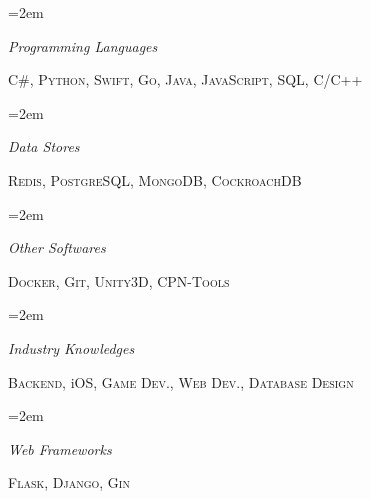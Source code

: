 \documentclass[paper=a4,fontsize=11pt]{scrartcl} %
\newlength{\spacebox}
\newcommand{\sepspace}{\vspace*{1em}}        %
\newcommand{\PersonalEntry}[2]{
        \noindent\hangindent=2em\hangafter=0 %
        \parbox{\spacebox}{        %
        \textit{#1}}               %
        \hspace{1.5em} #2 \par}    %
\newcommand{\SkillsEntry}[2]{      %
        \noindent\hangindent=2em\hangafter=0 %
        \parbox{\spacebox}{        %
        \textit{#1}}               %
        \hspace{1.5em} #2 \par}    %
\begin{document}
\SkillsEntry{Programming Languages}{\textsc{C\#}, \textsc{Python}, \textsc{Swift}, \textsc{Go}, \textsc{Java}, \textsc{JavaScript}, \textsc{SQL}, \textsc{C/C++}}
\sepspace

\SkillsEntry{Data Stores}{\textsc{Redis}, \textsc{PostgreSQL}, \textsc{MongoDB}, \textsc{CockroachDB}}
\sepspace

\SkillsEntry{Other Softwares}{\textsc{Docker}, \textsc{Git}, \textsc{Unity3D}, \textsc{CPN-Tools}}
\sepspace

\SkillsEntry{Industry Knowledges}{\textsc{Backend}, iOS, \textsc{Game Dev.}, \textsc{Web Dev.}, \textsc{Database Design}}
\sepspace

\SkillsEntry{Web Frameworks}{\textsc{Flask}, \textsc{Django}, \textsc{Gin}}
\sepspace
\end{document}
